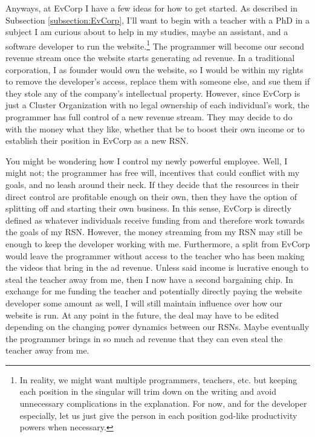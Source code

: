 \documentclass{article}[10pt]
\begin{document}
Anyways, at EvCorp I have a few ideas for how to get started. 
As described in Subsection \ref{subsection:EvCorp}, I'll want to begin with a teacher with a PhD in a subject I am curious about to help in my studies, maybe an assistant, and a software developer to run the website.\footnote{
    In reality, we might want multiple programmers, teachers, etc. but keeping each position in the singular will trim down on the writing and avoid unnecessary complications in the explanation. 
    For now, and for the developer especially, let us just give the person in each position god-like productivity powers when necessary.}
The programmer will become our second revenue stream once the website starts generating ad revenue.
In a traditional corporation, I as founder would own the website, so I would be within my rights to remove the developer's access, replace them with someone else, and sue them if they stole any of the company's intellectual property.
However, since EvCorp is just a Cluster Organization with no legal ownership of each individual's work, the programmer has full control of a new revenue stream.
They may decide to do with the money what they like, whether that be to boost their own income or to establish their position in EvCorp as a new RSN.\par

You might be wondering how I control my newly powerful employee.
Well, I might not; the programmer has free will, incentives that could conflict with my goals, and no leash around their neck.
If they decide that the resources in their direct control are profitable enough on their own, then they have the option of splitting off and starting their own business.
In this sense, EvCorp is directly defined as whatever individuals receive funding from and therefore work towards the goals of my RSN.
However, the money streaming from my RSN may still be enough to keep the developer working with me.
Furthermore, a split from EvCorp would leave the programmer without access to the teacher who has been making the videos that bring in the ad revenue.
Unless said income is lucrative enough to steal the teacher away from me, then I now have a second bargaining chip.
In exchange for me funding the teacher and potentially directly paying the website developer some amount as well, I will still maintain influence over how our website is run.
At any point in the future, the deal may have to be edited depending on the changing power dynamics between our RSNs.
Maybe eventually the programmer brings in so much ad revenue that they can even steal the teacher away from me.\par
\end{document}
